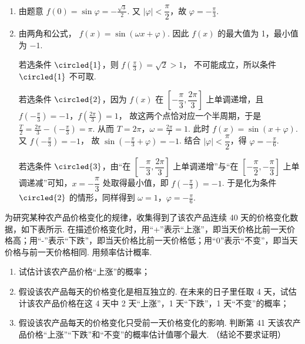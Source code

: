 \begin{solution}
\begin{enumerate}
\item 由题意
\(f(0)=\sin \varphi=-\frac{\sqrt{3}}{2}\).
又 \(|\varphi|<\dfrac{\pi}{2}\)，故
\(\varphi=-\frac{\pi}{3}\).

\item 由两角和公式，
\(f(x)=\sin(\omega x+\varphi)\).
因此 \(f(x)\) 的最大值为 1，最小值为 \(-1\).

若选条件 \(\circled{1}\)，则
\(f\left(\frac{\pi}{3}\right)=\sqrt{2}>1\)，
不可能成立，所以条件 \(\circled{1}\) 不可取.

若选条件 \(\circled{2}\)，因为 \(f(x)\) 在 \(\left[-\dfrac{\pi}{3},\dfrac{2\pi}{3}\right]\) 上单调递增，且
\(f\left(-\frac{\pi}{3}\right)=-1\)，\(f\left(\frac{2\pi}{3}\right)=1\)，
故这两个点恰对应一个半周期，于是
\(\frac{T}{2}=\frac{2\pi}{3}-\left(-\frac{\pi}{3}\right)=\pi\).
从而
\(T=2\pi\)，\(\omega=\frac{2\pi}{T}=1\).
此时
\(f(x)=\sin(x+\varphi)\).
又
\(f\left(-\frac{\pi}{3}\right)=-1\)，
故
\(\sin\left(-\frac{\pi}{3}+\varphi\right)=-1\).
结合 \(|\varphi|<\dfrac{\pi}{2}\)，得
\(\varphi=-\frac{\pi}{6}\).

若选条件 \(\circled{3}\)，由“在 \(\left[-\dfrac{\pi}{3},\dfrac{2\pi}{3}\right]\) 上单调递增”与“在 \(\left[-\dfrac{\pi}{2},-\dfrac{\pi}{3}\right]\) 上单调递减”可知，\(x=-\dfrac{\pi}{3}\) 处取得最小值，即
\(f\left(-\frac{\pi}{3}\right)=-1\).
于是化为条件 \(\circled{2}\) 的情形，同样得到
\(\omega=1\)，\(\varphi=-\frac{\pi}{6}\).
\end{enumerate}
\end{solution}

\begin{problem}
为研究某种农产品价格变化的规律，收集得到了该农产品连续 40 天的价格变化数据，如下表所示. 在描述价格变化时，用“+”表示“上涨”，即当天价格比前一天价格高；用“-”表示“下跌”，即当天价格比前一天价格低；用“0”表示“不变”，即当天价格与前一天价格相同. 用频率估计概率.

\begin{center}
\end{center}

\begin{enumerate}
\item 试估计该农产品价格“上涨”的概率；
\item 假设该农产品每天的价格变化是相互独立的. 在未来的日子里任取 4 天，试估计该农产品价格在这 4 天中 2 天“上涨”，1 天“下跌”，1 天“不变”的概率；
\item 假设该农产品每天的价格变化只受前一天价格变化的影响. 判断第 41 天该农产品价格“上涨”“下跌”和“不变”的概率估计值哪个最大. （结论不要求证明）
\end{enumerate}
\end{problem}

